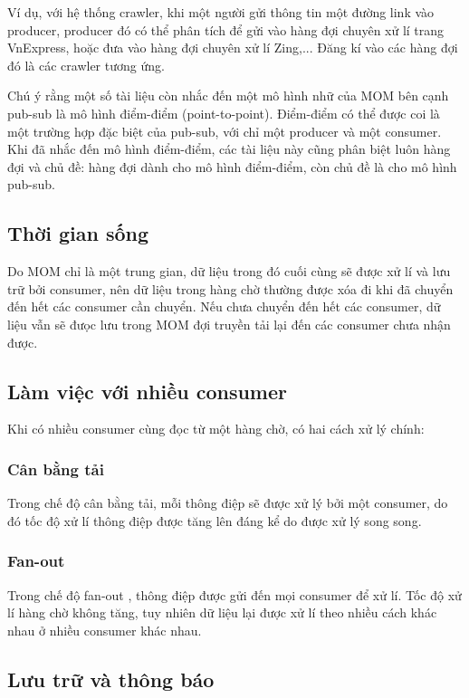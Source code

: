 \documentclass{article}
\begin{document}
Ví dụ, với hệ thống crawler, khi một người gửi thông tin một đường link vào
producer, producer đó có thể phân tích để gửi vào hàng đợi chuyên xử lí trang
VnExpress, hoặc đưa vào hàng đợi chuyên xử lí Zing,... Đăng kí vào các hàng đợi
đó là các crawler tương ứng.

Chú ý rằng một số tài liệu còn nhắc đến một mô hình nhữ của MOM bên cạnh pub-sub
là mô hình điểm-điểm (point-to-point). Điểm-điểm có thể được coi là một trường
hợp đặc biệt của pub-sub, với chỉ một producer và một consumer. Khi đã nhắc đến
mô hình điểm-điểm, các tài liệu này cũng phân biệt luôn hàng đợi và chủ đề: hàng
đợi dành cho mô hình điểm-điểm, còn chủ đề là cho mô hình pub-sub.

\subsection{Thời gian sống}

Do MOM chỉ là một trung gian, dữ liệu trong đó cuối cùng sẽ được xử lí và lưu
trữ bởi consumer, nên dữ liệu trong hàng chờ thường được xóa đi khi đã chuyển
đến hết các consumer cần chuyển. Nếu chưa chuyển đến hết các consumer, dữ liệu
vẫn sẽ đưọc lưu trong MOM đợi truyền tải lại đến các consumer chưa nhận được.

\subsection{Làm việc với nhiều consumer}

Khi có nhiều consumer cùng đọc từ một hàng chờ, có hai cách xử lý chính:

\subsubsection{Cân bằng tải}

Trong chế độ cân bằng tải, mỗi thông điệp sẽ được xử lý bởi một consumer, do đó
tốc độ xử lí thông điệp được tăng lên đáng kể do được xử lý song song.

\subsubsection{Fan-out}

Trong chế độ fan-out \cite{waitingforcode2019}, thông điệp được gửi đến mọi
consumer để xử lí. Tốc độ xử lí hàng chờ không tăng, tuy nhiên dữ liệu lại được
xử lí theo nhiều cách khác nhau ở nhiều consumer khác nhau.

\subsection{Lưu trữ và thông báo}
\end{document}

